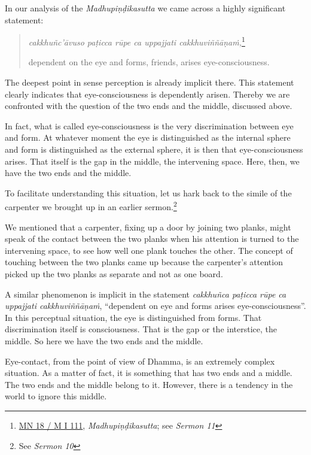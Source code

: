 In our analysis of the \emph{Madhupiṇḍikasutta} we came across a highly significant statement:

\begin{quote}
\emph{cakkhuñc'āvuso paṭicca rūpe ca uppajjati cakkhuviññāṇaṁ,}\footnote{\href{https://suttacentral.net/mn18/pli/ms}{MN 18 / M I 111}, \emph{Madhupiṇḍikasutta}; see \emph{Sermon 11}}

dependent on the eye and forms, friends, arises eye-consciousness.
\end{quote}

The deepest point in sense perception is already implicit there. This statement clearly indicates that eye-consciousness is dependently arisen. Thereby we are confronted with the question of the two ends and the middle, discussed above.

In fact, what is called eye-consciousness is the very discrimination between eye and form. At whatever moment the eye is distinguished as the internal sphere and form is distinguished as the external sphere, it is then that eye-consciousness arises. That itself is the gap in the middle, the intervening space. Here, then, we have the two ends and the middle.

To facilitate understanding this situation, let us hark back to the simile of the carpenter we brought up in an earlier sermon.\footnote{See \emph{Sermon 10}}

We mentioned that a carpenter, fixing up a door by joining two planks, might speak of the contact between the two planks when his attention is turned to the intervening space, to see how well one plank touches the other. The concept of touching between the two planks came up because the carpenter's attention picked up the two planks as separate and not as one board.

A similar phenomenon is implicit in the statement \emph{cakkhuñca paṭicca rūpe ca uppajjati cakkhuviññāṇaṁ}, ``dependent on eye and forms arises eye-consciousness''. In this perceptual situation, the eye is distinguished from forms. That discrimination itself is consciousness. That is the gap or the interstice, the middle. So here we have the two ends and the middle.

\enlargethispage{\baselineskip}

Eye-contact, from the point of view of Dhamma, is an extremely complex situation. As a matter of fact, it is something that has two ends and a middle. The two ends and the middle belong to it. However, there is a tendency in the world to ignore this middle.

